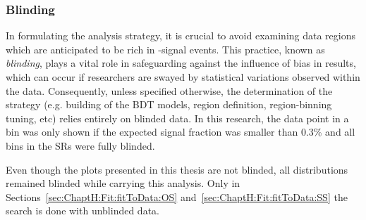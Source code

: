 \subsubsection{Blinding}
\label{sec:ChaptH:Fit:strategy:blinding}
In formulating the analysis strategy, it is crucial to avoid examining data regions 
which are anticipated to be rich in \tHq-signal events. This practice, known as 
\textit{blinding}, plays a vital role in safeguarding against the influence of bias in 
results, which can occur if researchers are swayed by statistical variations observed 
within the data. Consequently, unless specified otherwise, the determination of the 
strategy  (e.g. building of the BDT models, region definition, region-binning tuning, etc) 
relies entirely on blinded data.
In this research, the data point in a bin was only shown if the expected signal fraction was smaller than 0.3\% and all bins in
the SRs were fully blinded. %

Even though the plots presented in this thesis are not blinded, all distributions remained 
blinded while carrying this analysis. Only in Sections~\ref{sec:ChaptH:Fit:fitToData:OS} and~\ref{sec:ChaptH:Fit:fitToData:SS}
 the search is done with unblinded data.





